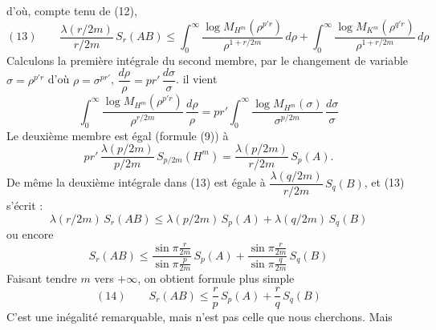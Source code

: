 \documentclass[11pt,a4paper]{article}
\begin{document}
 d'où, compte tenu de (12),
\[
  (13)\qquad \frac{\lambda(r/2m)}{r/2m}\, S_r(AB) \leq \int_0^\infty \frac{\log M_{H^m}(\rho^{p'r})}{\rho^{1 + r/2m}}\, d\rho + \int_0^\infty \frac{\log M_{K^m}(\rho^{q'r})}{\rho^{1 + r/2m}}\, d\rho
\]
Calculons  la première intégrale du second membre, par le changement de variable $\sigma = \rho^{p'r}$ d'où $\rho = \sigma^{pr'}$, $\dfrac{d\rho}{\rho} = pr'\,\dfrac{d\sigma}{\sigma}$. il vient
\[
  \int_0^\infty \frac{\log M_{H^m}(\rho^{p'r})}{\rho^{r/2m}}\, \frac{d\rho}{\rho} = pr' \int_0^\infty \frac{\log M_{H^m}(\sigma)}{\sigma^{p/2m}}\, \frac{d\sigma}{\sigma}
\]
Le deuxième membre est égal (formule (9)) à
\[
  pr'\, \frac{\lambda(p/2m)}{p/2m}\, S_{p/2m}(H^m) = \frac{\lambda(p/2m)}{r/2m}\, S_p(A).
\]
  De même la deuxième intégrale dans (13) est égale à $\dfrac{\lambda(q/2m)}{r/2m}\, S_q(B)$, et (13) s'écrit \struck{\ill{}} :
\[
  \lambda(r/2m)\, S_r(AB) \leq \lambda(p/2m)\, S_p(A) + \lambda(q/2m)\, S_q(B)
\]
ou encore
\[
  S_r(AB) \leq \frac{\sin \pi \frac{r}{2m}}{\sin \pi \frac{p}{2m}}\, S_p(A) + \frac{\sin \pi \frac{r}{2m}}{\sin \pi \frac{q}{2m}}\, S_q(B)
\]
  Faisant tendre $m$ vers $+\infty$, on obtient  formule plus simple
\[
  (14)\qquad S_r(AB) \leq \frac{r}{p}\, S_p(A) + \frac{r}{q}\, S_q(B)
\]
 C'est une inégalité remarquable, mais n'est pas celle que nous cherchons. Mais  \struck{\ill{}}
\end{document}
